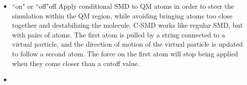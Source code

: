 \begin{itemize}
\item
{}%
{``on" or ``off"}{off}{%
Apply conditional SMD to QM atoms in order to steer the simulation 
within the QM region, while avoiding bringing atoms too close together 
and destabilizing the molecule. C-SMD works like regular SMD, but 
with pairs of atoms. The first atom is pulled by a string connected 
to a virtual particle, and the direction of motion of the virtual 
particle is updated to follow a second atom. The force on the first 
atom will stop being applied when they come closer than a cutoff value.
}

\item
{}

\end{itemize}

